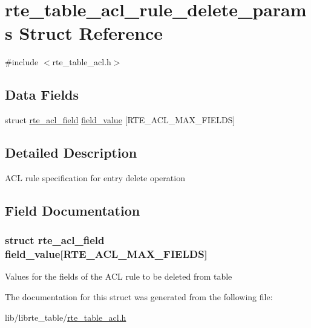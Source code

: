 \hypertarget{structrte__table__acl__rule__delete__params}{}\section{rte\+\_\+table\+\_\+acl\+\_\+rule\+\_\+delete\+\_\+params Struct Reference}
\label{structrte__table__acl__rule__delete__params}


{\ttfamily \#include $<$rte\+\_\+table\+\_\+acl.\+h$>$}

\subsection*{Data Fields}
\begin{DoxyCompactItemize}
\item 
struct \hyperlink{structrte__acl__field}{rte\+\_\+acl\+\_\+field} \hyperlink{structrte__table__acl__rule__delete__params_abe9119683c49ea1a0dca0e47ea78555d}{field\+\_\+value} \mbox{[}R\+T\+E\+\_\+\+A\+C\+L\+\_\+\+M\+A\+X\+\_\+\+F\+I\+E\+L\+D\+S\mbox{]}
\end{DoxyCompactItemize}


\subsection{Detailed Description}
A\+C\+L rule specification for entry delete operation 

\subsection{Field Documentation}
\hypertarget{structrte__table__acl__rule__delete__params_abe9119683c49ea1a0dca0e47ea78555d}{}
\subsubsection[{field\+\_\+value}]{\setlength{\rightskip}{0pt plus 5cm}struct {\bf rte\+\_\+acl\+\_\+field} field\+\_\+value\mbox{[}R\+T\+E\+\_\+\+A\+C\+L\+\_\+\+M\+A\+X\+\_\+\+F\+I\+E\+L\+D\+S\mbox{]}}\label{structrte__table__acl__rule__delete__params_abe9119683c49ea1a0dca0e47ea78555d}
Values for the fields of the A\+C\+L rule to be deleted from table 

The documentation for this struct was generated from the following file\+:\begin{DoxyCompactItemize}
\item 
lib/librte\+\_\+table/\hyperlink{rte__table__acl_8h}{rte\+\_\+table\+\_\+acl.\+h}\end{DoxyCompactItemize}
